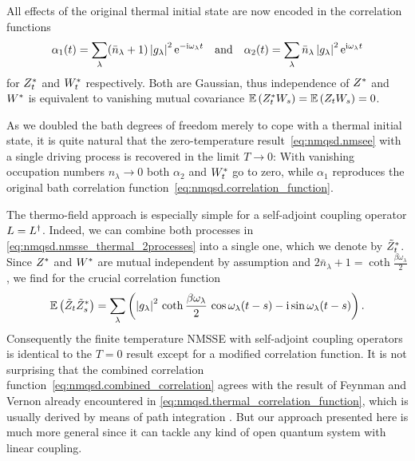 All effects of the original thermal initial state are now encoded in the correlation functions
\begin{equation}
  \alpha_1(t) = \sum_\lambda (\bar n_\lambda + 1) \abs{g_\lambda}^2 \exp[-\ii\omega_\lambda t] \quad \mbox{and} \quad
  \alpha_2(t) = \sum_\lambda \bar n_\lambda \abs{g_\lambda}^2 \exp[\ii\omega_\lambda t]
  \label{eq:nmqsd.cov_2processes}
\end{equation}
for ${Z}^*_t$ and ${W}^*_t$ respectively.
Both are Gaussian, thus independence of ${Z}^*$ and ${W}^*$ is equivalent to vanishing mutual covariance $\E[\ZZ_t W_s] = \E[Z_t W_s] = 0$.

As we doubled the bath degrees of freedom merely to cope with a thermal initial state, it is quite natural that the zero-temperature result~\ref{eq:nmqsd.nmsee} with a single driving process is recovered in the limit $T \to 0$:
With vanishing occupation numbers $n_\lambda \to 0$ both $\alpha_2$ and ${W}^*_t$ go to zero, while $\alpha_1$ reproduces the original bath correlation function~\ref{eq:nmqsd.correlation_function}.

The thermo-field approach is especially simple for a self-adjoint coupling operator $L = L^\dagger$.
Indeed, we can combine both processes in \autoref{eq:nmqsd.nmsse_thermal_2processes} into a single one, which we denote by ${\tilde Z}^*_t$.
Since ${Z}^*$ and ${W}^*$ are mutual independent by assumption and $2\bar n_\lambda + 1 = \coth{\frac{\beta\omega_\lambda}{2}}$, we find for the crucial correlation function
\begin{equation}
  \E[\tilde Z_t \tildeZZ_s] = \sum_\lambda \left(\abs{g_\lambda}^2 \, \coth{\frac{\beta \omega_\lambda}{2}} \, \cos{\omega_\lambda (t-s)} - \ii \sin{\omega_\lambda (t-s)} \right).
  \label{eq:nmqsd.combined_correlation}
\end{equation}
Consequently the finite temperature NMSSE with self-adjoint coupling operators is identical to the $T=0$ result except for a modified correlation function.
It is not surprising that the combined correlation function~\ref{eq:nmqsd.combined_correlation} agrees with the result of Feynman and Vernon already encountered in \autoref{eq:nmqsd.thermal_correlation_function}, which is usually derived by means of path integration \cite{FeVe63_quantum_dissipative}.
But our approach presented here is much more general since it can tackle any kind of open quantum system with linear coupling.


